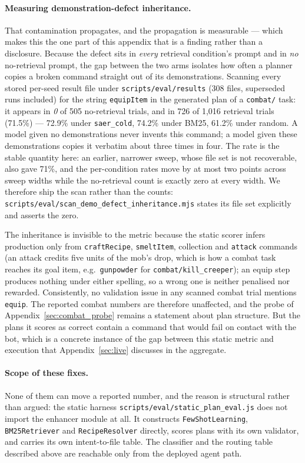 \documentclass[letterpaper]{article} %
\newcommand{\appref}[1]{Appendix~\ref{#1}}
\begin{document}
\paragraph{Measuring demonstration-defect inheritance.}  That
contamination propagates, and the propagation is measurable --- which
makes this the one part of this appendix that is a finding rather than a
disclosure.  Because the defect sits in \emph{every} retrieval
condition's prompt and in \emph{no} no-retrieval prompt, the gap between
the two arms isolates how often a planner copies a broken command
straight out of its demonstrations.  Scanning every stored per-seed
result file under \texttt{scripts/eval/results} (308 files, superseded
runs included) for the string \texttt{equipItem} in the generated plan
of a \texttt{combat/} task: it appears in \emph{0} of 505 no-retrieval
trials, and in 726 of 1{,}016 retrieval trials (71.5\%) --- 72.9\% under
\texttt{saer\_cold}, 74.2\% under BM25, 61.2\% under random.  A model
given no demonstrations never invents this command; a model given these
demonstrations copies it verbatim about three times in four.  The rate
is the stable quantity here: an earlier, narrower sweep, whose file set is
not recoverable, also gave 71\%, and the per-condition rates move by at most
two points across sweep widths while the no-retrieval count is exactly
zero at every width.  We therefore ship the scan rather than the counts:
\texttt{scripts/eval/scan\_demo\_defect\_inheritance.mjs} states its
file set explicitly and asserts the zero.

The inheritance is invisible to the metric because the static scorer
infers production only from \texttt{craftRecipe}, \texttt{smeltItem},
collection and \texttt{attack} commands (an attack credits five units of the mob's
drop, which is how a combat task reaches its goal item, e.g.\ \texttt{gunpowder}
for \texttt{combat/kill\_creeper}); an equip step
produces nothing under either spelling, so a wrong one is neither
penalised nor rewarded.  Consistently, no validation issue in any
scanned combat trial mentions \texttt{equip}.  The reported combat
numbers are therefore unaffected, and the probe of
\appref{sec:combat_probe} remains a statement about plan structure.  But
the plans it scores as correct contain a command that would fail on
contact with the bot, which is a concrete instance of the gap between
this static metric and execution that \appref{sec:live} discusses in the
aggregate.

\paragraph{Scope of these fixes.}  None of them can move a reported
number, and the reason is structural rather than argued: the static
harness \texttt{scripts/eval/static\_plan\_eval.js} does not import the
enhancer module at all.  It constructs \texttt{FewShotLearning}, \texttt{BM25Retriever} and
\texttt{RecipeResolver} directly, scores plans with its own validator, and carries its own intent-to-file
table.  The classifier and the routing table described above are
reachable only from the deployed agent path.
\end{document}
